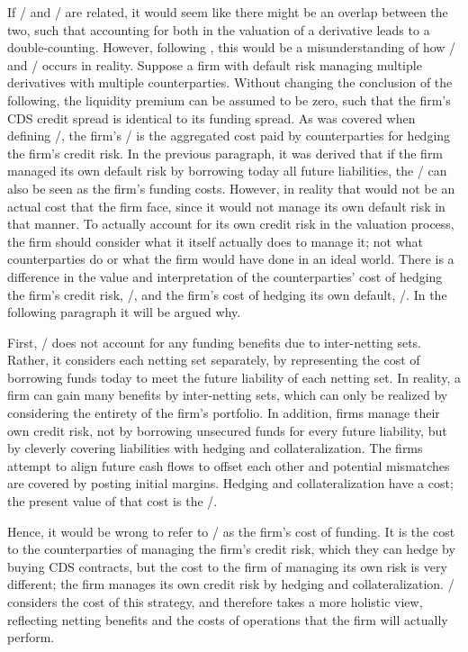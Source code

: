 \documentclass[main.tex]{subfiles}
\begin{document}
    If \DVA/ and \FVA/ are related, it would seem like there might be an overlap between the two,
    such that accounting for both in the valuation of a derivative leads to a double-counting.
    However, following \textcite{Ruiz2015XVA}, 
    this would be a misunderstanding of how \DVA/ and \FVA/ occurs in reality.
    Suppose a firm with default risk managing multiple derivatives with multiple counterparties.
    Without changing the conclusion of the following, 
    the liquidity premium can be assumed to be zero, 
    such that the firm's CDS credit spread is identical to its funding spread.
    As was covered when defining \DVA/, the firm's \DVA/ is the aggregated cost
    paid by counterparties for hedging the firm's credit risk.
    In the previous paragraph, it was derived that if the firm managed its own default risk 
    by borrowing today all future liabilities,
    the \DVA/ can also be seen as the firm's funding costs.
    However, in reality that would not be an actual cost that the firm face,
    since it would not manage its own default risk in that manner.
    To actually account for its own credit risk in the valuation process,
    the firm should consider what it itself actually does to manage it;
    not what counterparties do or what the firm would have done in an ideal world.
    There is a difference in the value and interpretation 
    of the counterparties' cost of hedging the firm's credit risk, \DVA/,
    and the firm's cost of hedging its own default, \FVA/.
    In the following paragraph it will be argued why.

    First, \DVA/ does not account for any funding benefits due to inter-netting sets.
    Rather, it considers each netting set separately, by representing the cost 
    of borrowing funds today to meet the future liability of each netting set.
    In reality, a firm can gain many benefits by inter-netting sets,
    which can only be realized by considering the entirety of the firm's portfolio.
    In addition, firms manage their own credit risk,
    not by borrowing unsecured funds for every future liability,
    but by cleverly covering liabilities
    with hedging and collateralization.
    The firms attempt to align future cash flows to offset each other
    and potential mismatches are covered by posting initial margins. 
    Hedging and collateralization have a cost; 
    the present value of that cost is the \FVA/.

    Hence, it would be wrong to refer to \DVA/ as the firm's cost of funding.
    It is the cost to the counterparties of managing the firm's credit risk,
    which they can hedge by buying CDS contracts,
    but the cost to the firm of managing its own risk is very different;
    the firm manages its own credit risk by hedging and collateralization.
    \FVA/ considers the cost of this strategy, and therefore takes a more holistic view, 
    reflecting netting benefits and the costs of operations that the firm will actually perform.
\end{document}
